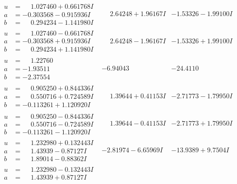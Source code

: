 \documentclass[1p]{elsarticle_modified}
\theoremstyle{definition}
\begin{document}
$$\begin{array}{c|c|c}
\begin{aligned}
u &= \phantom{-}1.027460 + 0.661768 I \\
a &= -0.303568 - 0.915936 I \\
b &= \phantom{-}0.294234 - 1.141980 I\end{aligned}
 & \phantom{-}2.64248 + 1.96167 I & -1.53326 - 1.99100 I \\ \hline\begin{aligned}
u &= \phantom{-}1.027460 - 0.661768 I \\
a &= -0.303568 + 0.915936 I \\
b &= \phantom{-}0.294234 + 1.141980 I\end{aligned}
 & \phantom{-}2.64248 - 1.96167 I & -1.53326 + 1.99100 I \\ \hline\begin{aligned}
u &= \phantom{-}1.22760\phantom{ +0.000000I} \\
a &= -1.93511\phantom{ +0.000000I} \\
b &= -2.37554\phantom{ +0.000000I}\end{aligned}
 & -6.94043\phantom{ +0.000000I} & -24.4110\phantom{ +0.000000I} \\ \hline\begin{aligned}
u &= \phantom{-}0.905250 + 0.844336 I \\
a &= \phantom{-}0.550716 + 0.724589 I \\
b &= -0.113261 + 1.120920 I\end{aligned}
 & \phantom{-}1.39644 + 0.41153 I & -2.71773 - 1.79950 I \\ \hline\begin{aligned}
u &= \phantom{-}0.905250 - 0.844336 I \\
a &= \phantom{-}0.550716 - 0.724589 I \\
b &= -0.113261 - 1.120920 I\end{aligned}
 & \phantom{-}1.39644 - 0.41153 I & -2.71773 + 1.79950 I \\ \hline\begin{aligned}
u &= \phantom{-}1.232980 + 0.132443 I \\
a &= \phantom{-}1.43939 - 0.87127 I \\
b &= \phantom{-}1.89014 - 0.88362 I\end{aligned}
 & -2.81974 - 6.65969 I & -13.9389 + 9.7504 I \\ \hline\begin{aligned}
u &= \phantom{-}1.232980 - 0.132443 I \\
a &= \phantom{-}1.43939 + 0.87127 I \\

\end{aligned}
\end{array}$$
\end{document}
